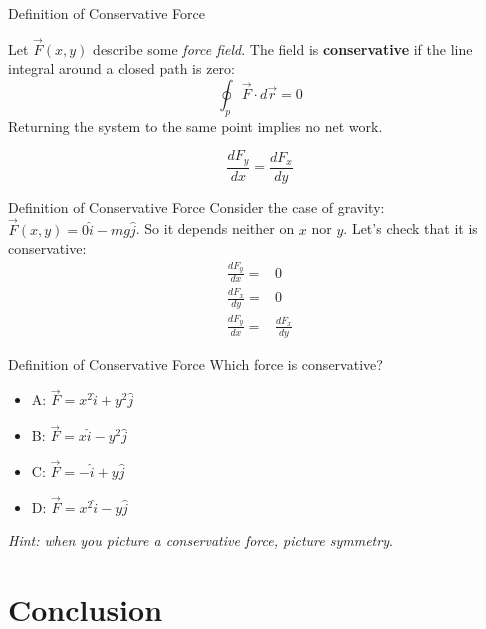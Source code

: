 \documentclass{beamer}
\begin{document}
\begin{frame}{Definition of Conservative Force}
\begin{tcolorbox}[colback=white,colframe=red!40!blue,title=Definition of Conservative Force]
\alert{Let $\vec{F}(x,y)$ describe some \textit{force field}.  The field is \textbf{conservative} if the line integral around a closed path is zero: \\
\begin{equation}
\oint_{p} \vec{F} \cdot d\vec{r} = 0
\end{equation}
Returning the system to the same point implies no net work.}
\end{tcolorbox}
\begin{tcolorbox}[colback=white,colframe=red!40!blue,title=Corollary 1]
\begin{equation}
\frac{dF_y}{dx} = \frac{dF_x}{dy}
\end{equation}
\end{tcolorbox}
\end{frame}

\begin{frame}{Definition of Conservative Force}
Consider the case of gravity: $\vec{F}(x,y) = 0\hat{i} -mg \hat{j}$.  So it depends neither on $x$ nor $y$.  Let's check that it is conservative:
\begin{align}
\frac{dF_y}{dx} =& 0 \\
\frac{dF_x}{dy} =& 0 \\
\frac{dF_y}{dx} =& \frac{dF_x}{dy}
\end{align}
\end{frame}

\begin{frame}{Definition of Conservative Force}
Which force is conservative?
\begin{itemize}
\item A: $\vec{F} = x^2\hat{i}+y^2\hat{j}$
\item B: $\vec{F} = x\hat{i}-y^2\hat{j}$
\item C: $\vec{F} = -\hat{i}+y\hat{j}$
\item D: $\vec{F} = x^2\hat{i}-y\hat{j}$
\end{itemize}
\textit{Hint: when you picture a conservative force, picture symmetry}.
\end{frame}

\section{Conclusion}
\end{document}
